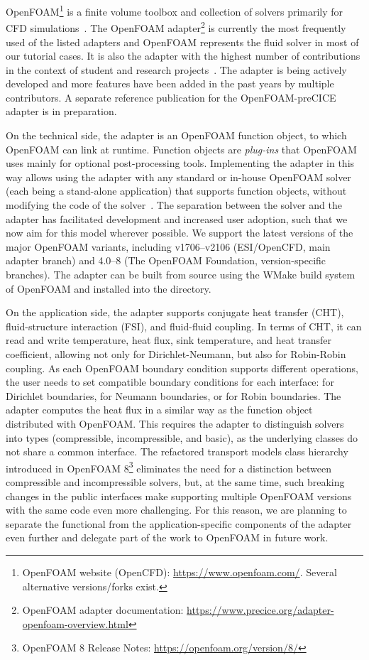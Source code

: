OpenFOAM\footnote{OpenFOAM website (OpenCFD): \url{https://www.openfoam.com/}. Several alternative versions/forks exist.} is a finite volume toolbox and collection of solvers primarily for CFD simulations~\cite{Weller1998_OpenFOAM}.
The OpenFOAM adapter\footnote{OpenFOAM adapter documentation: \url{https://www.precice.org/adapter-openfoam-overview.html}} is currently the most frequently used of the listed adapters and OpenFOAM represents the fluid solver in most of our tutorial cases.
It is also the adapter with the highest number of contributions in the context of student and research projects~\cite{CheungYau2016, Chourdakis2017, Risseeuw2019, Chourdakis2019_OFW14}.
The adapter is being actively developed and more features have been added in the past years by multiple contributors. A separate reference publication for the OpenFOAM-preCICE adapter is in preparation.

On the technical side, the adapter is an OpenFOAM function object, to which OpenFOAM can link at runtime.
Function objects are \emph{plug-ins} that OpenFOAM uses mainly for optional post-processing tools.
Implementing the adapter in this way allows using the adapter with any standard or in-house OpenFOAM solver (each being a stand-alone application) that supports function objects, without modifying the code of the solver~\cite{Chourdakis2017}.
The separation between the solver and the adapter has facilitated development and increased user adoption, such that we now aim for this model wherever possible. We support the latest versions of the major OpenFOAM variants,
including v1706--v2106 (ESI/OpenCFD, main adapter branch) and 4.0--8 (The OpenFOAM Foundation, version-specific branches).
The adapter can be built from source using the WMake build system of OpenFOAM and installed into the  directory.

On the application side, the adapter supports conjugate heat transfer (CHT), fluid-structure interaction (FSI), and fluid-fluid coupling. 
In terms of CHT, it can read and write temperature, heat flux, sink temperature, and heat transfer coefficient, 
allowing not only for Dirichlet-Neumann, but also for Robin-Robin coupling.
As each OpenFOAM boundary condition supports different operations, the user needs to set compatible boundary conditions for
each interface:  for Dirichlet boundaries,  for Neumann boundaries, or  for Robin boundaries.
The adapter computes the heat flux in a similar way as the  function object distributed with OpenFOAM.
This requires the adapter to distinguish solvers into types (compressible, incompressible, and basic),
as the underlying classes do not share a common interface.
The refactored transport models class hierarchy introduced in OpenFOAM 8\footnote{OpenFOAM 8 Release Notes: \url{https://openfoam.org/version/8/}}
eliminates the need for a distinction between compressible and incompressible solvers,
but, at the same time, such breaking changes in the public interfaces make supporting multiple OpenFOAM versions with the same code even more challenging.
For this reason, we are planning to separate the functional from the application-specific components of the adapter even further
and delegate part of the work to OpenFOAM in future work.

